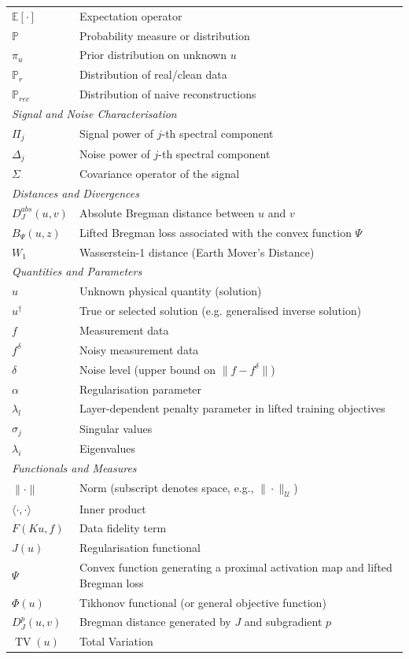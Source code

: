 \begin{longtable}{p{3cm} p{10cm}}
$\mathbb{E}[\cdot]$ & Expectation operator \\
$\mathbb{P}$ & Probability measure or distribution \\
$\pi_u$ & Prior distribution on unknown $u$ \\
$\mathbb{P}_r$ & Distribution of real/clean data \\
$\mathbb{P}_{rec}$ & Distribution of naive reconstructions \\
\hline
\multicolumn{2}{l}{\textit{Signal and Noise Characterisation}} \\
$\Pi_j$ & Signal power of $j$-th spectral component \\
$\Delta_j$ & Noise power of $j$-th spectral component \\
$\Sigma$ & Covariance operator of the signal \\
\hline
\multicolumn{2}{l}{\textit{Distances and Divergences}} \\
$D_J^{abs}(u,v)$ & Absolute Bregman distance between $u$ and $v$ \\
$B_{\Psi}(u, z)$ & Lifted Bregman loss associated with the convex function $\Psi$ \\
$W_1$ & Wasserstein-1 distance (Earth Mover's Distance) \\
\hline
\multicolumn{2}{l}{\textit{Quantities and Parameters}} \\
$u$ & Unknown physical quantity (solution) \\
$u^\dagger$ & True or selected solution (e.g. generalised inverse solution) \\
$f$ & Measurement data \\
$f^\delta$ & Noisy measurement data \\
$\delta$ & Noise level (upper bound on $\|f - f^\delta\|$) \\
$\alpha$ & Regularisation parameter \\
$\lambda_l$ & Layer-dependent penalty parameter in lifted training objectives \\
$\sigma_j$ & Singular values \\
$\lambda_i$ & Eigenvalues \\
\hline
\multicolumn{2}{l}{\textit{Functionals and Measures}} \\
$\|\cdot\|$ & Norm (subscript denotes space, e.g., $\|\cdot\|_\mathcal{U}$) \\
$\langle \cdot, \cdot \rangle$ & Inner product \\
$F(Ku, f)$ & Data fidelity term \\
$J(u)$ & Regularisation functional \\
$\Psi$ & Convex function generating a proximal activation map and lifted Bregman loss \\
$\Phi(u)$ & Tikhonov functional (or general objective function) \\
$D_J^p(u, v)$ & Bregman distance generated by $J$ and subgradient $p$ \\
$\operatorname{TV}(u)$ & Total Variation \\
\end{longtable}